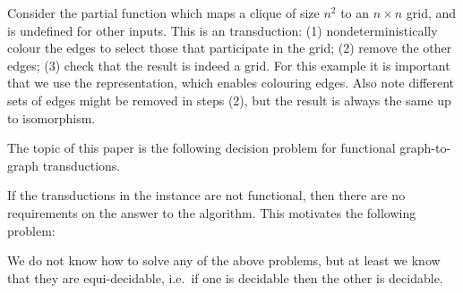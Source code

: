 \begin{example}
    Consider the partial function which maps a clique of size $n^2$ to an $n\times n$ grid, and is undefined for other inputs.  This is an \mso transduction: (1) nondeterministically colour the edges to select those that participate in the grid; (2) remove the other edges; (3) check that the result is indeed a grid. For this example it is important that we use the \msotwo representation, which enables colouring edges.  Also note  different sets of edges might be removed in steps (2), but the result is always the same up to isomorphism.
\end{example}    

The topic of this paper is   the following  decision problem for functional \mso graph-to-graph transductions. 


If the  transductions in the instance are not functional, then there are no requirements on the answer to the algorithm. This motivates the following problem:

    
We do not know how to solve any of the above problems, but at least we know that they are equi-decidable, i.e.~if one is decidable then the other is decidable. 


